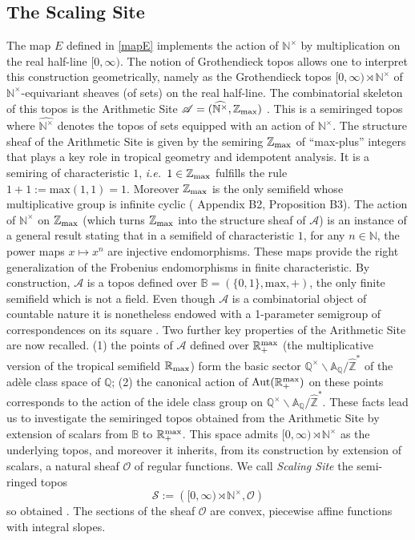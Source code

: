 \documentclass[graybox, envcountsect%
]{svmult}
\def\Aut{{\rm Aut}}
\def\A{{\mathbb A}}
\def\B{{\mathbb B}}
\def\N{{\mathbb N}}
\def\Q{{\mathbb Q}}
\def\R{{\mathbb R}}
\def\Z{{\mathbb Z}}
\def\aarith{{\mathfrak A}}
\def\cO{{\mathcal O}}
\def\scal{{(\rnt,\cO)}}
\newcommand{\ie}{{\it i.e.\/}\ }
\def\zmax{{\Z_{\rm max}}}
\def\rhmax{{\R_{\rm max}}}
\def\rmax{\R_+^{\rm max}}
\def\arith{{(\wnt,\Z_{\rm max})}}
\def\nt{\N^{\times}}
\def\wnt{{\widehat{\N^{\times}}}}
\def\rnt{{[0,\infty)\rtimes{\N^{\times}}}}
\def\arith{{(\wnt,\zmax)}}
\def\aarith{{\mathscr A}}
\def\scal{{(\rnt,\cO)}}
\def\scal1{{\hat \aarith}}
\def\scal2{{\mathscr S}}
\begin{document}
\subsection{The Scaling Site}\label{subsec:2.2}

The  map $E$ defined in \eqref{mapE} implements the action of $\nt$ by multiplication on the real half-line $[0,\infty)$. The notion of Grothendieck topos allows one to interpret this  construction geometrically, namely as  
the Grothendieck topos $\rnt$ of $\nt$-equivariant sheaves (of sets) on the real half-line.\newline
The combinatorial skeleton of this topos is the  Arithmetic Site $\aarith=\arith$ \cite{CC1,CC2}. This is a semiringed topos where  $\wnt$ denotes the topos of sets equipped with an action of $\nt$. The structure sheaf of the  Arithmetic Site is given by  the semiring $\zmax$ of ``max-plus'' integers that plays a key role in tropical geometry and idempotent analysis. It is a semiring of characteristic $1$, \ie $1\in \zmax$ fulfills the rule $1+1:=\text{max}(1,1)=1$. Moreover $\zmax$ is the only  semifield whose multiplicative group is infinite cyclic (\cite{CC4} Appendix B2, Proposition B3). The action of $\nt$ on $\zmax$ (which turns $\zmax$ into the structure sheaf of $\aarith$) is an instance of a general result \cite{Golan} stating that in a semifield of characteristic $1$, for any $n\in\N$, the power maps $x\mapsto x^n$ are injective endomorphisms.  These maps provide the right generalization of the Frobenius endomorphisms in finite characteristic.    
By construction, $\aarith$ is a topos defined over $\B=(\{0,1\},\text{max},+)$, the only finite semifield which is not a field. Even though $\aarith$ is    a combinatorial object of countable nature it is nonetheless endowed with a 1-parameter semigroup of correspondences on its square \cite{CC1, CC2}. Two further key properties of the Arithmetic Site  are now recalled. (1) the points of $\aarith$ defined over $\rmax$ (the multiplicative version of the tropical semifield $\rhmax$) form the basic sector $\Q^\times\backslash\A_\Q/\hat\Z^*$ of the ad\`ele class space of $\Q$; (2) the canonical action of $\Aut(\rmax)$ on these points corresponds to the action of the idele class group on $\Q^\times\backslash\A_\Q/\hat\Z^*$. These facts lead us to investigate the semiringed topos obtained from the Arithmetic Site by extension of scalars from $\B$ to $\rmax$. This space admits $\rnt$ as the underlying topos, and  
moreover it inherits, from its construction by extension of scalars, a natural sheaf $\cO$ of regular functions. We call  {\em Scaling Site}  the semi-ringed topos  
\[
\scal2:=\left(\rnt,\cO\right)
\]
 so obtained \cite{CC3, CC4}.  The sections of the sheaf $\cO$ are convex,  piecewise affine functions with integral slopes.
 
\end{document}
